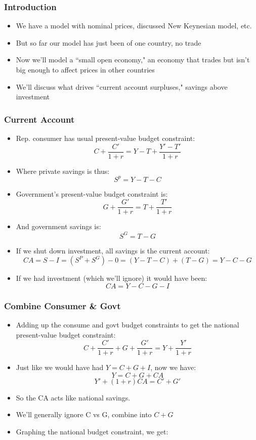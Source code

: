 \documentclass{beamer}
\author{Trevor S. Gallen}
\date{}
\begin{document}
\renewcommand*{\inserttotalframenumber}{\pageref{lastframe}}



\begin{frame}
\titlepage
\end{frame}

\begin{frame}
\frametitle[alignment=center]{Introduction}
\begin{itemize}
\item We have a model with nominal prices, discussed New Keynesian model, etc.
\bigskip
\item But so far our model has just been of one country, no trade
\bigskip
\item Now we'll model  a ``small open economy," an economy that trades but isn't big enough to affect prices in other countries
\bigskip
\item We'll discuss what drives ``current account surpluses," savings above investment
\end{itemize}
\end{frame}

\begin{frame}
\frametitle[alignment=center]{Current Account}
\begin{itemize}
\item Rep. consumer has usual present-value budget constraint:
$$C+\frac{C'}{1+r}=Y-T+\frac{Y'-T'}{1+r}$$
\item Where private savings is thus:
$$S^p=Y-T-C$$
\item Government's present-value budget constraint is:
$$G+\frac{G'}{1+r}=T+\frac{T'}{1+r}$$
\item And government savings is:
$$S^G=T-G$$
\item If we shut down investment, all savings is the current account:
$$CA=S-I=(S^P+S^G)-0=(Y-T-C)+(T-G)=Y-C-G$$
\item If we had investment (which we'll ignore) it would have been:
$$CA=Y-C-G-I$$
\end{itemize}
\end{frame}


\begin{frame}
\frametitle[alignment=center]{Combine Consumer \& Govt}
\begin{itemize}
\item Adding up the consume and govt budget constraints to get the national present-value budget constraint:
$$C+\frac{C'}{1+r}+G+\frac{G'}{1+r}=Y+\frac{Y'}{1+r}$$
\item Just like we would have had $Y=C+G+I$, now we have:
$$Y=C+G+CA$$
$$Y'+(1+r)CA=C'+G'$$
\item So the CA acts like national savings.
\smallskip
\item We'll generally ignore C vs G, combine into $C+G$
\smallskip
\item Graphing the national budget constraint, we get:
\end{itemize}
\end{frame}
\end{document}
